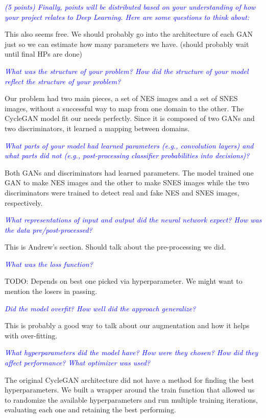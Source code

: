 \documentclass[10pt,twocolumn,letterpaper]{article}
\begin{document}
\textit{\textcolor{blue}{(5 points) Finally, points will be distributed based on your understanding of how your project relates to Deep Learning. Here are some questions to think about:}}

This also seems free. We should probably go into the architecture of each GAN just so we can estimate how many parameters we have. (should probably wait until final HPs are done)

\textit{\textcolor{blue}{What was the structure of your problem? How did the structure of your model reflect the structure of your problem?}} 

Our problem had two main pieces, a set of NES images and a set of SNES images, without a successful way to map from one domain to the other. The CycleGAN model fit our needs perfectly. Since it is composed of two GANs and two discriminators, it learned a mapping between domains.

\textit{\textcolor{blue}{What parts of your model had learned parameters (e.g., convolution layers) and what parts did not (e.g., post-processing classifier probabilities into decisions)? }}

Both GANs and discriminators had learned parameters. The model trained one GAN to make NES images and the other to make SNES images while the two discriminators were trained to detect real and fake NES and SNES images, respectively.

\textit{\textcolor{blue}{What representations of input and output did the neural network expect? How was the data pre/post-processed?}}

This is Andrew's section. Should talk about the pre-processing we did.

\textit{\textcolor{blue}{What was the loss function?}}

TODO: Depends on best one picked via hyperparameter. We might want to mention the losers in passing.

\textit{\textcolor{blue}{Did the model overfit? How well did the approach generalize?}}

This is probably a good way to talk about our augmentation and how it helps with over-fitting.

\textit{\textcolor{blue}{What hyperparameters did the model have? How were they chosen? How did they affect performance? What optimizer was used?}}

The original CycleGAN architecture did not have a method for finding the best hyperparameters. We built a wrapper around the train function that allowed us to randomize the available hyperparameters and run multiple training iterations, evaluating each one and retaining the best performing. 
\end{document}
